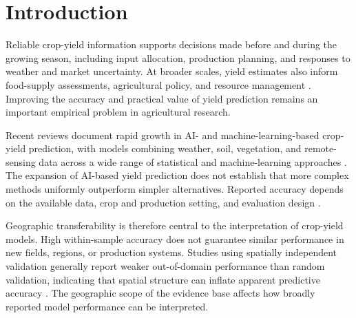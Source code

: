 \documentclass[ASNA,twocolumn]{USG}
\begin{document}


\maketitle

\section{Introduction}\label{sec:intro}


Reliable crop-yield information supports decisions made before and during the growing season,
including input allocation, production planning, and responses to weather and market
uncertainty. At broader scales, yield estimates also inform food-supply assessments,
agricultural policy, and resource management \cite{vanKlompenburg2020}. Improving the accuracy
and practical value of yield prediction remains an important empirical problem in
agricultural research.

Recent reviews document rapid growth in AI- and machine-learning-based crop-yield prediction,
with models combining weather, soil, vegetation, and remote-sensing data across a wide range of
statistical and machine-learning approaches \cite{Shawon2025,vanKlompenburg2020}. The expansion
of AI-based yield prediction does not establish that more complex methods uniformly outperform
simpler alternatives. Reported accuracy depends on the available data, crop and production setting,
and evaluation design \cite{Jabed2024}.

Geographic transferability is therefore central to the interpretation of crop-yield models.
High within-sample accuracy does not guarantee similar performance in new fields, regions, or
production systems. Studies using spatially independent validation generally report weaker
out-of-domain performance than random validation, indicating that spatial structure can
inflate apparent predictive accuracy \cite{Habibi2024,Okupska2026,Stiller2024}. The geographic scope of the evidence base affects how broadly reported model
performance can be interpreted.
\end{document}

